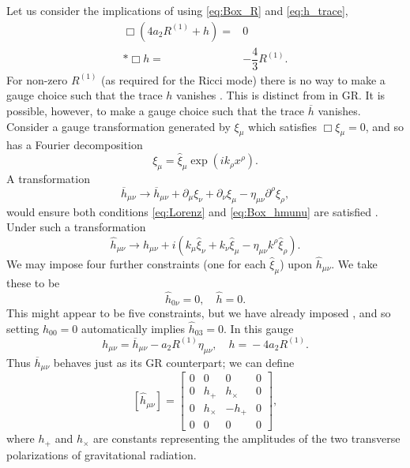Let us consider the implications of  using \eqref{eq:Box_R} and \eqref{eq:h_trace},
\begin{align}
\Box\left(4a_2R^{(1)} + h\right) = {} & 0 \nonumber \\*
\Box h = {} & -\dfrac{4}{3}R^{(1)}.
\end{align}
For non-zero $R^{(1)}$ (as required for the Ricci mode) there is no way to make a gauge choice such that the trace $h$ vanishes \citep{Corda2008, Capozziello2008}. This is distinct from in GR. It is possible, however, to make a gauge choice such that the trace $\overline{h}$ vanishes. Consider a gauge transformation generated by $\xi_\mu$ which satisfies $\Box \xi_\mu = 0$, and so has a Fourier decomposition
\begin{equation}
\xi_\mu = \widehat{\xi}_\mu \exp\left(ik_\rho x^\rho\right).
\end{equation}
A transformation
\begin{equation}
\overline{h}_{\mu\nu} \rightarrow \overline{h}_{\mu\nu} + \partial_\mu\xi_\nu + \partial_\nu\xi_\mu - \eta_{\mu\nu}\partial^\rho\xi_\rho,
\end{equation}
would ensure both conditions \eqref{eq:Lorenz} and \eqref{eq:Box_hmunu} are satisfied \cite[section 35.2]{Misner1973}. Under such a transformation
\begin{equation}
\widehat{h}_{\mu\nu} \rightarrow \widehat{h}_{\mu\nu} + i\left(k_\mu\widehat{\xi}_\nu + k_\nu\widehat{\xi}_\mu - \eta_{\mu\nu}k^\rho\widehat{\xi}_\rho\right).
\end{equation}
We may impose four further constraints (one for each $\widehat{\xi}_\mu$) upon $\widehat{h}_{\mu\nu}$. We take these to be \citep[section 4.4]{Wald1984}
\begin{equation}
\widehat{h}_{0\nu} = 0, \quad \widehat{h} = 0.
\end{equation}
This might appear to be five constraints, but we have already imposed , and so setting $\widehat{h}_{00} = 0$ automatically implies $\widehat{h}_{03} = 0$. In this gauge
\begin{equation}
h_{\mu\nu} = {} \overline{h}_{\mu\nu} - a_2 R^{(1)}\eta_{\mu\nu}, \quad h = {} -4a_2R^{(1)}.
\label{eq:gauge}
\end{equation}
Thus $\overline{h}_{\mu\nu}$ behaves just as its GR counterpart; we can define
\begin{equation}
\left[\widehat{h}_{\mu\nu}\right] =
\begin{bmatrix}
0 & 0 & 0 & 0\\
0 & h_+ & h_\times & 0\\
0 & h_\times & -h_+ & 0\\
0 & 0 & 0 & 0
\end{bmatrix},
\end{equation}
where $h_+$ and $h_\times$ are constants representing the amplitudes of the two transverse polarizations of gravitational radiation.

